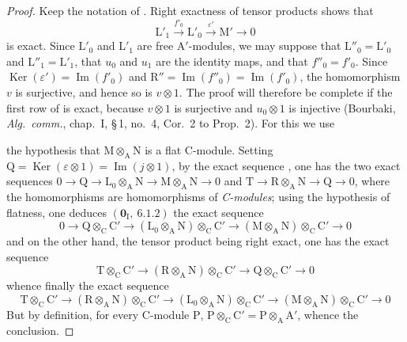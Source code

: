 \begin{proof}
Keep the notation of . Right exactness of tensor
products shows that
\[
  \mathrm{L}'_1\xrightarrow{f'_0}\mathrm{L}'_0
  \xrightarrow{\varepsilon'}\mathrm{M}'\longrightarrow0
\]
is exact. Since $\mathrm{L}'_0$ and $\mathrm{L}'_1$ are free
$\mathrm{A}'$-modules, we may suppose that
$\mathrm{L}''_0=\mathrm{L}'_0$ and
$\mathrm{L}''_1=\mathrm{L}'_1$, that $u_0$ and $u_1$ are the identity
maps, and that $f''_0=f'_0$. Since
$\operatorname{Ker}(\varepsilon')=\operatorname{Im}(f'_0)$ and
$\mathrm{R}''=\operatorname{Im}(f''_0)=\operatorname{Im}(f'_0)$, the
homomorphism $v$ is surjective, and hence so is $v\otimes1$. The proof
will therefore be complete if the first row of
 is exact, because $v\otimes1$ is
surjective and $u_0\otimes1$ is injective (Bourbaki,
\emph{Alg.\ comm.}, chap.~I, \S\,1, no.~4, Cor.~2 to Prop.~2). For this
we use


the hypothesis that $\mathrm{M}\otimes_\mathrm{A}\mathrm{N}$ is a flat C-module. Setting $\mathrm{Q}=\operatorname{Ker}(\varepsilon\otimes 1)=\operatorname{Im}(j\otimes 1)$, by the exact sequence , one has the two exact sequences $0\to\mathrm{Q}\to\mathrm{L}_0\otimes_\mathrm{A}\mathrm{N}\to\mathrm{M}\otimes_\mathrm{A}\mathrm{N}\to 0$ and $\mathrm{T}\to\mathrm{R}\otimes_\mathrm{A}\mathrm{N}\to\mathrm{Q}\to 0$, where the homomorphisms are homomorphisms of \emph{C-modules}; using the hypothesis of flatness, one deduces $(\mathbf{0}_\mathrm{I},~6.1.2)$ the exact sequence
\[
  0\to\mathrm{Q}\otimes_\mathrm{C}\mathrm{C}'\to(\mathrm{L}_0\otimes_\mathrm{A}\mathrm{N})\otimes_\mathrm{C}\mathrm{C}'\to(\mathrm{M}\otimes_\mathrm{A}\mathrm{N})\otimes_\mathrm{C}\mathrm{C}'\to 0
\]
and on the other hand, the tensor product being right exact, one has the exact sequence
\[
  \mathrm{T}\otimes_\mathrm{C}\mathrm{C}'\to(\mathrm{R}\otimes_\mathrm{A}\mathrm{N})\otimes_\mathrm{C}\mathrm{C}'\to\mathrm{Q}\otimes_\mathrm{C}\mathrm{C}'\to 0
\]
whence finally the exact sequence
\[
  \mathrm{T}\otimes_\mathrm{C}\mathrm{C}'\to(\mathrm{R}\otimes_\mathrm{A}\mathrm{N})\otimes_\mathrm{C}\mathrm{C}'\to(\mathrm{L}_0\otimes_\mathrm{A}\mathrm{N})\otimes_\mathrm{C}\mathrm{C}'\to(\mathrm{M}\otimes_\mathrm{A}\mathrm{N})\otimes_\mathrm{C}\mathrm{C}'\to 0
\]
But by definition, for every C-module $\mathrm{P}$, $\mathrm{P}\otimes_\mathrm{C}\mathrm{C}'=\mathrm{P}\otimes_\mathrm{A}\mathrm{A}'$, whence the conclusion.
\end{proof}


